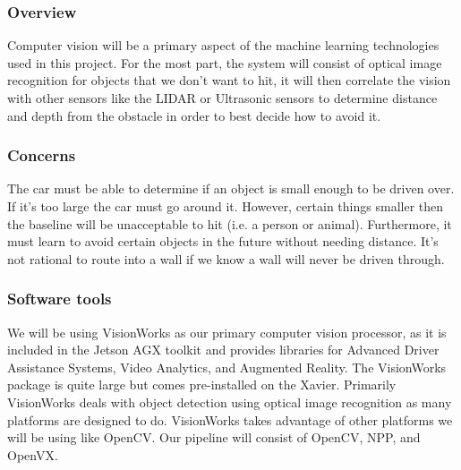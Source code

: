 \documentclass[onecolumn, draftclsnofoot, 10pt, compsoc]{IEEEtran}
\begin{document}
\subsubsection{Overview}

Computer vision will be a primary aspect of the machine learning technologies used in this project. For the most part, the system will consist of optical image recognition for objects that we don't want to hit, it will then correlate the vision with other sensors like the LIDAR or Ultrasonic sensors to determine distance and depth from the obstacle in order to best decide how to avoid it.

\subsubsection{Concerns}

The car must be able to determine if an object is small enough to be driven over. If it's too large the car must go around it. However, certain things smaller then the baseline will be unacceptable to hit (i.e. a person or animal). Furthermore, it must learn to avoid certain objects in the future without needing distance. It's not rational to route into a wall if we know a wall will never be driven through.


\subsubsection{Software tools}
We will be using VisionWorks as our primary computer vision processor, as it is included in the Jetson AGX toolkit and provides libraries for Advanced Driver Assistance Systems, Video Analytics, and Augmented Reality. The VisionWorks package is quite large but comes pre-installed on the Xavier. Primarily VisionWorks deals with object detection using optical image recognition as many platforms are designed to do. VisionWorks takes advantage of other platforms we will be using like OpenCV. Our pipeline will consist of OpenCV, NPP, and OpenVX. 
\end{document}
